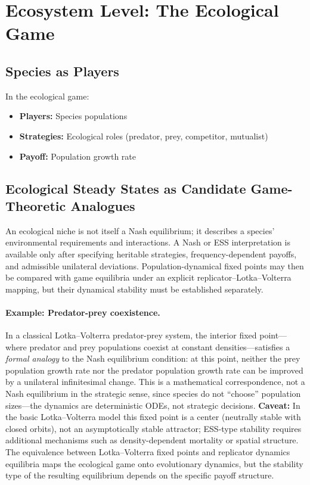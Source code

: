 \documentclass[12pt,a4paper]{article}
\theoremstyle{remark}
\begin{document}
\section{Ecosystem Level: The Ecological Game}
\label{sec:ecosystem}

\subsection{Species as Players}

In the ecological game:
\begin{itemize}
    \item \textbf{Players:} Species populations
    \item \textbf{Strategies:} Ecological roles (predator, prey, competitor, mutualist)
    \item \textbf{Payoff:} Population growth rate
\end{itemize}

\subsection{Ecological Steady States as Candidate Game-Theoretic Analogues}

An ecological niche is not itself a Nash equilibrium; it describes a species' environmental requirements and interactions. A Nash or ESS interpretation is available only after specifying heritable strategies, frequency-dependent payoffs, and admissible unilateral deviations. Population-dynamical fixed points may then be compared with game equilibria under an explicit replicator--Lotka--Volterra mapping, but their dynamical stability must be established separately.

\paragraph{Example: Predator-prey coexistence.}
In a classical Lotka--Volterra predator-prey system, the interior fixed point---where predator and prey populations coexist at constant densities---satisfies a \emph{formal analogy} to the Nash equilibrium condition: at this point, neither the prey population growth rate nor the predator population growth rate can be improved by a unilateral infinitesimal change. This is a mathematical correspondence, not a Nash equilibrium in the strategic sense, since species do not ``choose'' population sizes---the dynamics are deterministic ODEs, not strategic decisions. \textbf{Caveat:} In the basic Lotka--Volterra model this fixed point is a center (neutrally stable with closed orbits), not an asymptotically stable attractor; ESS-type stability requires additional mechanisms such as density-dependent mortality or spatial structure. The equivalence between Lotka--Volterra fixed points and replicator dynamics equilibria \citep[Chapter~7]{HofbauerSigmund1998} maps the ecological game onto evolutionary dynamics, but the stability type of the resulting equilibrium depends on the specific payoff structure.
\end{document}

